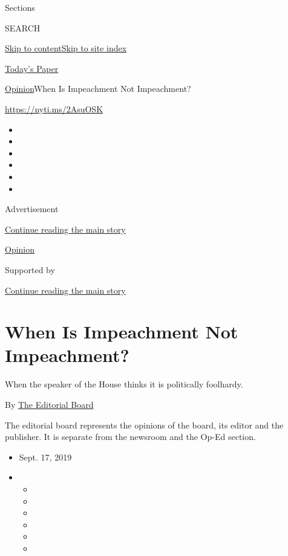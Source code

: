 Sections

SEARCH

\protect\hyperlink{site-content}{Skip to
content}\protect\hyperlink{site-index}{Skip to site index}

\href{https://myaccount.nytimes.com/auth/login?response_type=cookie\&client_id=vi}{}

\href{https://www.nytimes.com/section/todayspaper}{Today's Paper}

\href{/section/opinion}{Opinion}\textbar{}When Is Impeachment Not
Impeachment?

\href{https://nyti.ms/2AsuOSK}{https://nyti.ms/2AsuOSK}

\begin{itemize}
\item
\item
\item
\item
\item
\item
\end{itemize}

Advertisement

\protect\hyperlink{after-top}{Continue reading the main story}

\href{/section/opinion}{Opinion}

Supported by

\protect\hyperlink{after-sponsor}{Continue reading the main story}

\hypertarget{when-is-impeachment-not-impeachment}{%
\section{When Is Impeachment Not
Impeachment?}\label{when-is-impeachment-not-impeachment}}

When the speaker of the House thinks it is politically foolhardy.

By
\href{https://www.nytimes.com/interactive/opinion/editorialboard.html}{The
Editorial Board}

The editorial board represents the opinions of the board, its editor and
the publisher. It is separate from the newsroom and the Op-Ed section.

\begin{itemize}
\item
  Sept. 17, 2019
\item
  \begin{itemize}
  \item
  \item
  \item
  \item
  \item
  \item
  \end{itemize}
\end{itemize}

